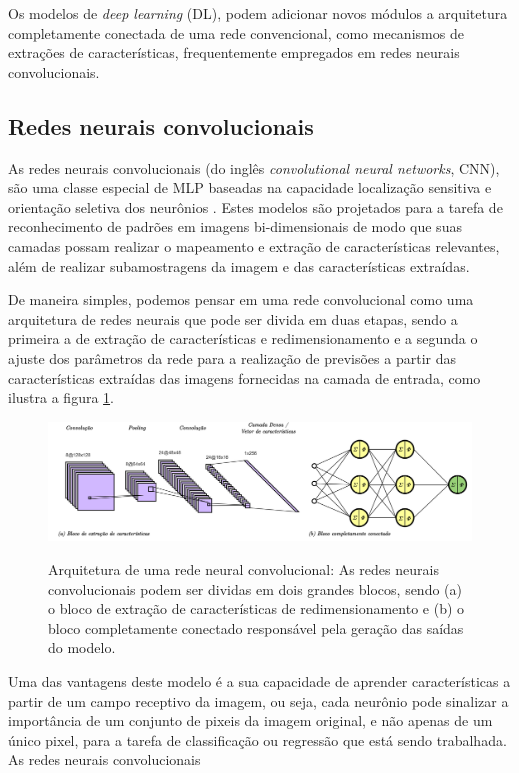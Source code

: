 Os modelos de \textit{deep learning} (DL), podem adicionar novos módulos a arquitetura completamente conectada de uma rede convencional, como mecanismos de extrações de características, frequentemente empregados em redes neurais convolucionais.

\subsection{Redes neurais convolucionais}

As redes neurais convolucionais (do inglês \textit{convolutional neural networks}, CNN), são uma classe especial de MLP baseadas na capacidade localização sensitiva e orientação seletiva dos neurônios \cite{haykinNeuralNetworksLearning2009}.
Estes modelos são projetados para a tarefa de reconhecimento de padrões em imagens bi-dimensionais de modo que suas camadas possam realizar o mapeamento e extração de características relevantes, além de realizar subamostragens da imagem e das características extraídas.

De maneira simples, podemos pensar em uma rede convolucional como uma arquitetura de redes neurais que pode ser divida em duas etapas, sendo a primeira a de extração de características e redimensionamento e a segunda o ajuste dos parâmetros da rede para a realização de previsões a partir das características extraídas das imagens fornecidas na camada de entrada, como ilustra a figura \ref{fig:cnn}.

\begin{figure}[htbp]
	\centering
	\caption[Arquitetura de uma rede neural convolucional]{Arquitetura de uma rede neural convolucional: As redes neurais convolucionais podem ser dividas em dois grandes blocos, sendo (a) o bloco de extração de características de redimensionamento e (b) o bloco completamente conectado responsável pela geração das saídas do modelo.}
		\includegraphics[scale=.23]{imagens/cnn.png}
	\label{fig:cnn}
\end{figure}

Uma das vantagens deste modelo é a sua capacidade de aprender características a partir de um campo receptivo da imagem, ou seja, cada neurônio pode sinalizar a importância de um conjunto de pixeis da imagem original, e não apenas de um único pixel, para a tarefa de classificação ou regressão que está sendo trabalhada. As redes neurais convolucionais




